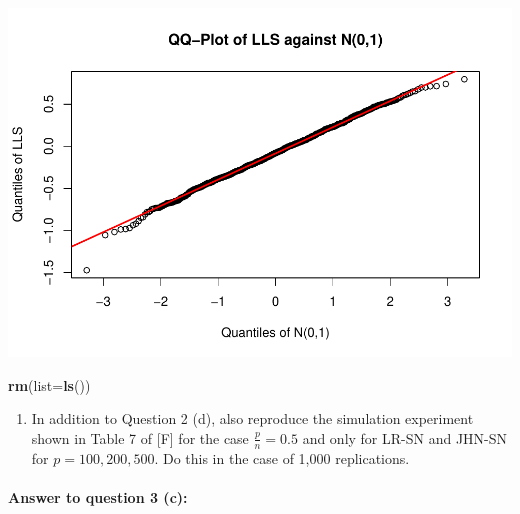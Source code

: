 \documentclass[
]{article}
\newenvironment{Shaded}{\begin{snugshade}}{\end{snugshade}}
\newcommand{\AttributeTok}[1]{\textcolor[rgb]{0.13,0.29,0.53}{#1}}
\newcommand{\FunctionTok}[1]{\textcolor[rgb]{0.13,0.29,0.53}{\textbf{#1}}}
\newcommand{\NormalTok}[1]{#1}
\providecommand{\tightlist}{%
  \setlength{\itemsep}{0pt}\setlength{\parskip}{0pt}}
\begin{document}
\includegraphics{A5_files/figure-latex/unnamed-chunk-48-1.pdf}

\begin{Shaded}
\begin{Highlighting}[]
\FunctionTok{rm}\NormalTok{(}\AttributeTok{list=}\FunctionTok{ls}\NormalTok{())}
\end{Highlighting}
\end{Shaded}

\begin{enumerate}
\def\labelenumi{(\alph{enumi})}
\setcounter{enumi}{2}
\tightlist
\item
  In addition to Question 2 (d), also reproduce the simulation
  experiment shown in Table 7 of {[}F{]} for the case
  \(\frac{p}{n} = 0.5\) and only for LR-SN and JHN-SN for
  \(p = 100, 200, 500\). Do this in the case of 1,000 replications.
\end{enumerate}

\paragraph{\texorpdfstring{\textbf{Answer to question 3
(c)}:}{Answer to question 3 (c):}}\label{answer-to-question-3-c}
\end{document}
